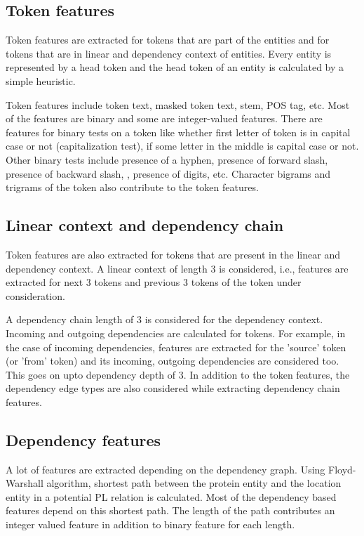 \subsection*{Token features}

Token features are extracted for tokens that are part of the entities and for tokens that are in linear and dependency context of entities. Every entity is represented by a head token and the head token of an entity is calculated by a simple heuristic.

Token features include token text, masked token text, stem, POS tag, etc. Most of the features are binary and some are integer-valued features. There are features for binary tests on a token like whether first letter of token is in capital case or not (capitalization test), if some letter in the middle is capital case or not. Other binary tests include presence of a hyphen, presence of forward slash, presence of backward slash, , presence of digits, etc. Character bigrams and trigrams of the token also contribute to the token features.

\subsection*{Linear context and dependency chain}

Token features are also extracted for tokens that are present in the linear and dependency context. A linear context of length 3 is considered, i.e., features are extracted for next 3 tokens and previous 3 tokens of the token under consideration.

A dependency chain length of 3 is considered for the dependency context. Incoming and outgoing dependencies are calculated for tokens. For example, in the case of incoming dependencies, features are extracted for the 'source' token (or 'from' token) and its incoming, outgoing dependencies are considered too. This goes on upto dependency depth of 3. In addition to the token features, the dependency edge types are also considered while extracting dependency chain features.

\subsection*{Dependency features}

A lot of features are extracted depending on the dependency graph. Using Floyd-Warshall algorithm, shortest path between the protein entity and the location entity in a potential PL relation is calculated. Most of the dependency based features depend on this shortest path. The length of the path contributes an integer valued feature in addition to binary feature for each length.

